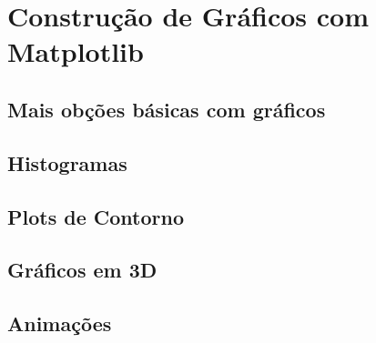 \chapter{Construção de Gráficos com Matplotlib}
\section{Mais obções básicas com gráficos}
\section{Histogramas}
\section{Plots de Contorno}
\section{Gráficos em 3D}
\section{Animações}